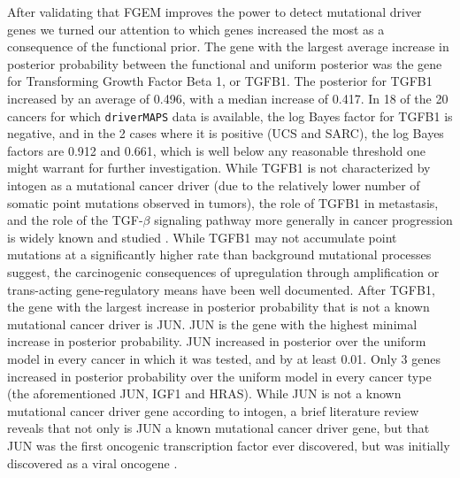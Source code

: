 After validating that FGEM improves the power to detect mutational driver genes we turned our attention to which genes increased the most as a consequence of the functional prior.  The gene with the largest average increase in posterior probability between the functional and uniform posterior  was the gene for  Transforming Growth Factor Beta 1, or TGFB1.  The posterior for TGFB1 increased by an average of 0.496, with a median increase of 0.417.  In 18 of the 20 cancers for which \texttt{driverMAPS} data is available, the log Bayes factor for TGFB1 is negative, and in the 2 cases where it is positive (UCS and SARC), the log Bayes factors are 0.912 and 0.661, which is well below any reasonable threshold one might warrant for further investigation.  While TGFB1 is not characterized by intogen as a mutational cancer driver (due to the relatively lower number of somatic point mutations observed in tumors),  the role of TGFB1 in metastasis, and the role of the TGF-$\beta$ signaling pathway more generally in cancer progression is widely known and studied \cite{TGF_Zhao_2018}.  While TGFB1 may not accumulate point mutations at a significantly higher rate than background mutational processes suggest, the carcinogenic consequences of upregulation through amplification or trans-acting gene-regulatory means have been well documented\cite{TGF_Zhao_2018}\cite{Massagu__2008}.
After TGFB1, the gene with the largest increase in posterior probability that is not a known mutational cancer driver is JUN.  JUN is the gene with the highest minimal increase in posterior probability.  JUN increased in posterior over the uniform model in every cancer in which it was tested, and by at least 0.01.  Only 3 genes increased in posterior probability over the uniform model in every cancer type (the aforementioned JUN, IGF1 and HRAS). While JUN is not a known mutational cancer driver gene according to intogen, a brief literature review reveals that not only is JUN a known mutational cancer driver gene, but that JUN was the first oncogenic transcription factor ever discovered, but was initially discovered as a viral oncogene \cite{Vogt_2002}.  

